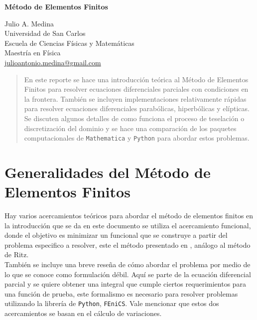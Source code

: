 \documentclass[a4paper]{article}
\begin{document}

\Large
 \begin{center}
\textbf{Método de Elementos Finitos}\\


\hspace{10pt}

\large
Julio A. Medina\\
\hspace{10pt}
\small  
Universidad de San Carlos\\
Escuela de Ciencias Físicas y Matemáticas\\
Maestría en Física\\
\href{mailto:julioantonio.medina@gmail.com}{julioantonio.medina@gmail.com}\\

\end{center}

\hspace{10pt}

\normalsize
\begin{abstract}
En este reporte se hace una introducción teórica al Método de Elementos Finitos para resolver ecuaciones diferenciales parciales con condiciones en la frontera. También se incluyen implementaciones relativamente rápidas para resolver ecuaciones diferenciales parabólicas, hiperbólicas y elípticas. Se discuten algunos detalles de como funciona el proceso de teselación o discretización del dominio y se hace una comparación de los paquetes computacionales de \texttt{Mathematica} y \texttt{Python} para abordar estos problemas.
\end{abstract}
\section{Generalidades del Método de Elementos Finitos}
Hay varios acercamientos teóricos para abordar el método de elementos finitos en la introducción que se da en este documento se utiliza el acercamiento funcional, donde el objetivo es minimizar un funcional que se construye a partir del problema especifico a resolver, este el método presentado en \cite{Burden}, análogo al método de Ritz.\\
También se incluye una breve reseña de cómo abordar el problema por medio de lo que se conoce como formulación débil. Aquí se parte de la ecuación diferencial parcial y se quiere obtener una integral que cumple ciertos requerimientos para una función de prueba, este formalismo es necesario para resolver problemas utilizando la librería de \texttt{Python}, \texttt{FEniCS}. Vale mencionar que estos dos acercamientos se basan en el cálculo de variaciones.
\end{document}
